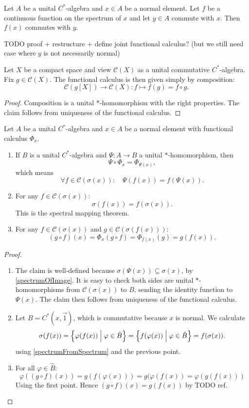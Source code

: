 \begin{proposition} \label{commutativityFunctionalCalculus}
Let $A$ be a unital $C^*$-algebra and $x\in A$ be a normal element. Let $f$ be a continuous function on the spectrum of $x$ and let $y\in A$ commute with $x$. Then $f(x)$ commutes with $y$.
\end{proposition}
TODO proof + restructure + define joint functional calculus? (but we still need case where $y$ is not necessarily normal)


\begin{lemma}
Let $X$ be a compact space and view $\mathcal{C}(X)$ as a unital commutative $C^*$-algebra. Fix $g\in\mathcal{C}(X)$. The functional calculus is then given simply by composition:
\[ \mathcal{C}(g[X]) \to \mathcal{C}(X): f\mapsto f(g) = f\circ g. \]
\end{lemma}
\begin{proof}
Composition is a unital $*$-homomorphism with the right properties. The claim follows from uniqueness of the functional calculus.
\end{proof}

\begin{proposition} \label{propertiesContinuousFunctionalCalculus}
Let $A$ be a unital $C^*$-algebra and $x\in A$ be a normal element with functional calculus $\Phi_x$.
\begin{enumerate}
\item If $B$ is a unital $C^*$-algebra and $\Psi: A\to B$ a unital $*$-homomorphism, then
\[ \Psi\circ\Phi_x = \Phi_{\Psi(x)}, \]
which means
\[ \forall f\in \mathcal{C}(\sigma(x)):\quad \Psi(f(x)) = f(\Psi(x)). \]
\item For any $f\in\mathcal{C}(\sigma(x))$:
\[ \sigma(f(x)) = f(\sigma(x)). \]
This is the spectral mapping theorem.
\item For any $f\in\mathcal{C}(\sigma(x))$ and $g\in\mathcal{C}(\sigma(f(x)))$:
\[ (g\circ f)(x) = \Phi_x(g\circ f) = \Phi_{f(x)}(g) = g(f(x)). \]
\end{enumerate}
\end{proposition}
\begin{proof}
\hspace{1em}
\begin{enumerate}
\item The claim is well-defined because $\sigma(\Psi(x))\subseteq \sigma(x)$, by \ref{spectrumOfImage}. It is easy to check both sides are unital $*$-homomorphisms from $\mathcal{C}(\sigma(x))$ to $B$, sending the identity function to $\Psi(x)$. The claim then follows from uniqueness of the functional calculus.
\item Let $B = C^*(x,\vec{1})$, which is commutative because $x$ is normal. We calculate
\[ \sigma(f(x)) = \left\{ \varphi(f(x)) \;\middle|\; \varphi\in\hat{B} \right\} = \left\{ f(\varphi(x)) \;\middle|\; \varphi\in\hat{B} \right\} = f(\sigma(x)). \]
using \ref{spectrumFromSpectrum} and the previous point.
\item For all $\varphi\in\hat{B}$:
\[ \varphi((g\circ f)(x)) = g(f(\varphi(x))) = g(\varphi(f(x)) = \varphi(g(f(x))) \]
Using the first point. Hence $(g\circ f)(x) = g(f(x))$ by TODO ref.
\end{enumerate}
\end{proof}


